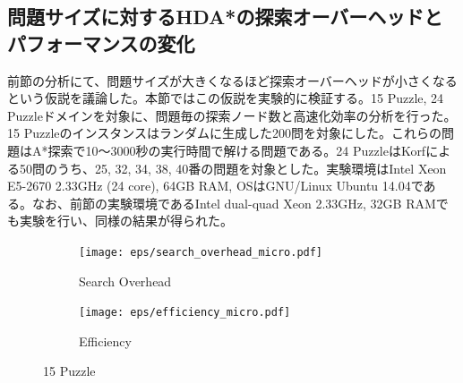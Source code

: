 \documentclass{jsarticle}
\begin{document}
\subsection{問題サイズに対するHDA*の探索オーバーヘッドとパフォーマンスの変化}
\label{sec:speedup_size}
前節の分析にて、問題サイズが大きくなるほど探索オーバーヘッドが小さくなるという仮説を議論した。本節ではこの仮説を実験的に検証する。15 Puzzle, 24 Puzzleドメインを対象に、問題毎の探索ノード数と高速化効率の分析を行った。15 Puzzleのインスタンスはランダムに生成した200問を対象にした。これらの問題はA*探索で10～3000秒の実行時間で解ける問題である。24 PuzzleはKorfによる50問のうち、25, 32, 34, 38, 40番の問題を対象とした\cite{Korf2002}。実験環境はIntel Xeon E5-2670 2.33GHz (24 core), 64GB RAM, OSはGNU/Linux Ubuntu 14.04である。なお、前節の実験環境であるIntel dual-quad Xeon 2.33GHz, 32GB RAMでも実験を行い、同様の結果が得られた。

\begin{figure}
	\centering
	\begin{subfigure}{0.45\columnwidth}
		\texttt{[image: eps/search\_overhead\_micro.pdf]}	
		\caption{Search Overhead}
		\label{fig:david_so}
	\end{subfigure}
	\begin{subfigure}{0.45\columnwidth}
		\texttt{[image: eps/efficiency\_micro.pdf]}	
		\caption{Efficiency}
		\label{fig:david_speedup}
	\end{subfigure}
	\caption{15 Puzzle}
	\label{fig:15_david}
\end{figure}
\end{document}
